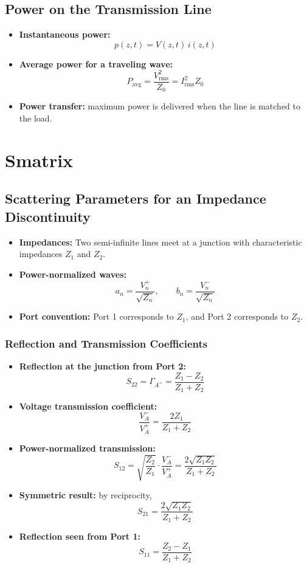 \documentclass{article}
\begin{document}
\subsection*{Power on the Transmission Line}
\begin{itemize}
    \item \textbf{Instantaneous power:} 
    \[
    p(z,t) = V(z,t)\, i(z,t)
    \]
    \item \textbf{Average power for a traveling wave:}
    \[
    P_{\text{avg}} = \frac{V_{\mathrm{rms}}^2}{Z_0} = I_{\mathrm{rms}}^2 Z_0
    \]
    \item \textbf{Power transfer:} maximum power is delivered when the line is matched to the load.
\end{itemize}

\section{Smatrix}
\subsection*{Scattering Parameters for an Impedance Discontinuity}
\begin{itemize}
    \item \textbf{Impedances:} Two semi-infinite lines meet at a junction with characteristic impedances $Z_1$ and $Z_2$.
    \item \textbf{Power-normalized waves:}
    \[
    a_n = \frac{V_n^+}{\sqrt{Z_n}}, \qquad b_n = \frac{V_n^-}{\sqrt{Z_n}}
    \]
    \item \textbf{Port convention:} Port 1 corresponds to $Z_1$, and Port 2 corresponds to $Z_2$.
\end{itemize}

\subsubsection*{Reflection and Transmission Coefficients}
\begin{itemize}
    \item \textbf{Reflection at the junction from Port 2:}
    \[
    S_{22} = \Gamma_{A^+} = \frac{Z_1 - Z_2}{Z_1 + Z_2}
    \]
    \item \textbf{Voltage transmission coefficient:}
    \[
    \frac{V_A^-}{V_A^+} = \frac{2Z_1}{Z_1 + Z_2}
    \]
    \item \textbf{Power-normalized transmission:}
    \[
    S_{12} = \sqrt{\frac{Z_2}{Z_1}} \cdot \frac{V_A^-}{V_A^+}
    = \frac{2\sqrt{Z_1 Z_2}}{Z_1 + Z_2}
    \]
    \item \textbf{Symmetric result:} by reciprocity,
    \[
    S_{21} = \frac{2\sqrt{Z_1 Z_2}}{Z_1 + Z_2}
    \]
    \item \textbf{Reflection seen from Port 1:}
    \[
    S_{11} = \frac{Z_2 - Z_1}{Z_1 + Z_2}
    \]
\end{itemize}
\end{document}
